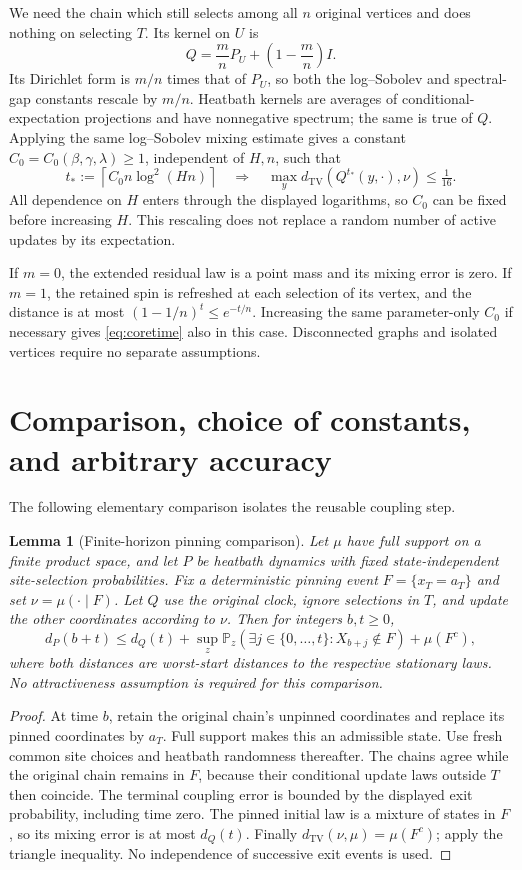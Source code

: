 \documentclass[11pt]{article}
\newtheorem{lemma}[theorem]{Lemma}
\theoremstyle{remark}\newtheorem{remark}[theorem]{Remark}
\newcommand{\TV}{d_{\mathrm{TV}}}
\newcommand{\Prob}{\mathbb P}
\begin{document}
We need the chain which still selects among all $n$ original vertices
and does nothing on selecting $T$. Its kernel on $U$ is
\[
 Q=\frac mn P_U+\left(1-\frac mn\right)I.
\]
Its Dirichlet form is $m/n$ times that of $P_U$, so both the
log--Sobolev and spectral-gap constants rescale by $m/n$.
Heatbath kernels are averages of conditional-expectation projections
and have nonnegative spectrum; the same is true of $Q$. Applying the
same log--Sobolev mixing estimate gives a constant
$C_0=C_0(\beta,\gamma,\lambda)\geq1$, independent of $H,n$, such that
\begin{equation}\label{eq:coretime}
 t_*:=\left\lceil C_0n\log^2(Hn)\right\rceil
 \quad\Longrightarrow\quad
 \max_y\TV(Q^{t_*}(y,\cdot),\nu)\leq\tfrac1{16}.
\end{equation}
All dependence on $H$ enters through the displayed logarithms, so $C_0$
can be fixed before increasing $H$. This rescaling does not replace a
random number of active updates by its expectation.

If $m=0$, the extended residual law is a point mass and its mixing error
is zero. If $m=1$, the retained spin is refreshed at each selection of
its vertex, and the distance is at most $(1-1/n)^t\leq e^{-t/n}$.
Increasing the same parameter-only $C_0$ if necessary gives
\eqref{eq:coretime} also in this case. Disconnected graphs and isolated
vertices require no separate assumptions.

\section{Comparison, choice of constants, and arbitrary accuracy}

The following elementary comparison isolates the reusable coupling step.
\begin{lemma}[Finite-horizon pinning comparison]\label{lem:transfer}
Let $\mu$ have full support on a finite product space, and let $P$ be
heatbath dynamics with fixed state-independent site-selection probabilities.
Fix a deterministic pinning event $F=\{x_T=a_T\}$ and set
$\nu=\mu(\cdot\mid F)$. Let $Q$ use the original clock, ignore selections
in $T$, and update the other coordinates according to $\nu$. Then for
integers $b,t\geq0$,
\[
 d_P(b+t)\leq d_Q(t)+
 \sup_z\Prob_z(\exists j\in\{0,\ldots,t\}:X_{b+j}\notin F)+\mu(F^c),
\]
where both distances are worst-start distances to the respective stationary
laws. No attractiveness assumption is required for this comparison.
\end{lemma}
\begin{proof}
At time $b$, retain the original chain's unpinned coordinates and replace
its pinned coordinates by $a_T$. Full support makes this an admissible
state. Use fresh common site choices and heatbath randomness thereafter.
The chains agree while the original chain remains in $F$, because their
conditional update laws outside $T$ then coincide. The terminal coupling
error is bounded by the displayed exit probability, including time zero.
The pinned initial law is a mixture of states in $F$, so its mixing error
is at most $d_Q(t)$. Finally $\TV(\nu,\mu)=\mu(F^c)$; apply the triangle
inequality. No independence of successive exit events is used.
\end{proof}
\end{document}
